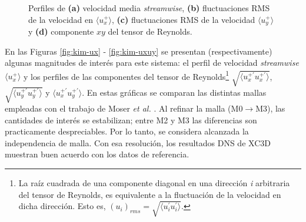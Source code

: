 \begin{figure}[H]
 \caption{Perfiles de \textbf{(a)} velocidad media \textit{streamwise}, \textbf{(b)} fluctuaciones RMS de la velocidad en $\langle u^+_x \rangle$, \textbf{(c)} fluctuaciones RMS de la velocidad $\langle u^+_y \rangle$ y \textbf{(d)} componente $xy$ del tensor de Reynolds. } 
 \label{fig:kim_1}
\end{figure}

En las Figuras \ref{fig:kim-ux} - \ref{fig:kim-uxuy} se presentan (respectivamente) algunas magnitudes de interés para este sistema: el perfil de velocidad \textit{streamwise} $\langle u^+_x \rangle$ y los perfiles de las componentes del tensor de Reynolds\footnote{La raíz cuadrada de una componente diagonal en una dirección \textit{i} arbitraria del tensor de Reynolds, es equivalente a la fluctuación de la velocidad en dicha dirección. Esto es, $(u_i)_{rms} = \sqrt{ \langle u^{\prime}_i u^{\prime}_i \rangle} $.} $\sqrt{\langle u^{+ \prime}_x u^{+ \prime}_x \rangle}$, $\sqrt{\langle u^{+ \prime}_y u^{+ \prime}_y \rangle}$ y $\langle u^{+ \prime}_x u^{+ \prime}_y \rangle$. En estas gráficas se comparan las distintas mallas empleadas con el trabajo de Moser \textit{et al.} \cite{moser1999}. Al refinar la malla (M0$\rightarrow$M3), las cantidades de interés se estabilizan; entre M2 y M3 las diferencias son practicamente despreciables. Por lo tanto, se considera alcanzada la independencia de malla. Con esa resolución, los resultados DNS de XC3D muestran buen acuerdo con los datos de referencia.


